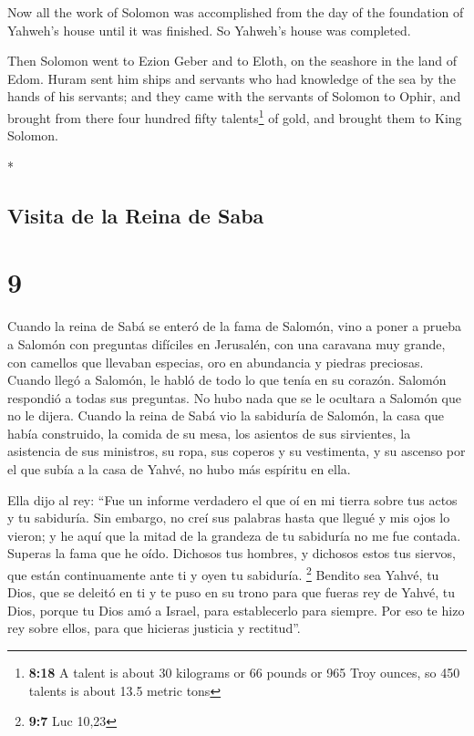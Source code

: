 \begin{paracol}{2}
\begin{otherlanguage}{english}
 Now all the work of Solomon was accomplished from the
day of the foundation of Yahweh's house until it was finished. So
Yahweh's house was completed.

 Then Solomon went to Ezion Geber and to Eloth, on the
seashore in the land of Edom.  Huram sent him ships and
servants who had knowledge of the sea by the hands of his servants; and
they came with the servants of Solomon to Ophir, and brought from there
four hundred fifty talents\footnote{\textbf{8:18} A talent is about 30
  kilograms or 66 pounds or 965 Troy ounces, so 450 talents is about
  13.5 metric tons} of gold, and brought them to King Solomon.

\end{otherlanguage}

\switchcolumn[0]*

\hypertarget{visita-de-la-reina-de-saba}{%
\subsection{Visita de la Reina de
Saba}\label{visita-de-la-reina-de-saba}}

\hypertarget{section-16}{%
\section{9}\label{section-16}}

 Cuando la reina de Sabá se enteró de la fama de Salomón,
vino a poner a prueba a Salomón con preguntas difíciles en Jerusalén,
con una caravana muy grande, con camellos que llevaban especias, oro en
abundancia y piedras preciosas. Cuando llegó a Salomón, le habló de todo
lo que tenía en su corazón.  Salomón respondió a todas sus
preguntas. No hubo nada que se le ocultara a Salomón que no le dijera.
 Cuando la reina de Sabá vio la sabiduría de Salomón, la
casa que había construido,  la comida de su mesa, los
asientos de sus sirvientes, la asistencia de sus ministros, su ropa, sus
coperos y su vestimenta, y su ascenso por el que subía a la casa de
Yahvé, no hubo más espíritu en ella.

 Ella dijo al rey: ``Fue un informe verdadero el que oí en
mi tierra sobre tus actos y tu sabiduría.  Sin embargo, no
creí sus palabras hasta que llegué y mis ojos lo vieron; y he aquí que
la mitad de la grandeza de tu sabiduría no me fue contada. Superas la
fama que he oído.  Dichosos tus hombres, y dichosos estos
tus siervos, que están continuamente ante ti y oyen tu sabiduría.
\footnote{\textbf{9:7} Luc 10,23}  Bendito sea Yahvé, tu
Dios, que se deleitó en ti y te puso en su trono para que fueras rey de
Yahvé, tu Dios, porque tu Dios amó a Israel, para establecerlo para
siempre. Por eso te hizo rey sobre ellos, para que hicieras justicia y
rectitud''.


\end{paracol}
